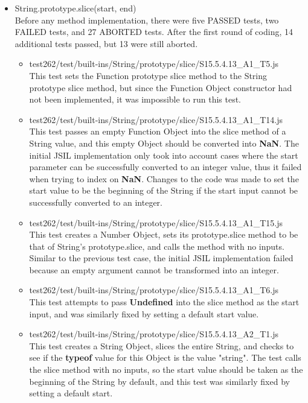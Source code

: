 \documentclass[a4paper,11pt,twoside]{report}
\begin{document}
\begin{itemize}
\item String.prototype.slice(start, end) \\
Before any method implementation, there were five PASSED tests, two FAILED tests, and 27 ABORTED tests. After the first round of coding, 14 additional tests passed, but 13 were still aborted. 
\begin{itemize}
\item test262/test/built-ins/String/prototype/slice/S15.5.4.13\_A1\_T5.js \\
This test sets the Function prototype slice method to the String prototype slice method, but since the Function Object constructor had not been implemented, it was impossible to run this test.
\item test262/test/built-ins/String/prototype/slice/S15.5.4.13\_A1\_T14.js \\
This test passes an empty Function Object into the slice method of a String value, and this empty Object should be converted into \textbf{NaN}. The initial JSIL implementation only took into account cases where the start parameter can be successfully converted to an integer value, thus it failed when trying to index on \textbf{NaN}. Changes to the code was made to set the start value to be the beginning of the String if the start input cannot be successfully converted to an integer.
\item test262/test/built-ins/String/prototype/slice/S15.5.4.13\_A1\_T15.js \\
This test creates a Number Object, sets its prototype.slice method to be that of String's prototype.slice, and calls the method with no inputs. Similar to the previous test case, the initial JSIL implementation failed because an empty argument cannot be transformed into an integer.
\item test262/test/built-ins/String/prototype/slice/S15.5.4.13\_A1\_T6.js \\
This test attempts to pass \textbf{Undefined} into the slice method as the start input, and was similarly fixed by setting a default start value.
\item test262/test/built-ins/String/prototype/slice/S15.5.4.13\_A2\_T1.js \\
This test creates a String Object, slices the entire String, and checks to see if the \textbf{typeof} value for this Object is the value "string". The test calls the slice method with no inputs, so the start value should be taken as the beginning of the String by default, and this test was similarly fixed by setting a default start.
\end{itemize}


\end{itemize}
\end{document}
